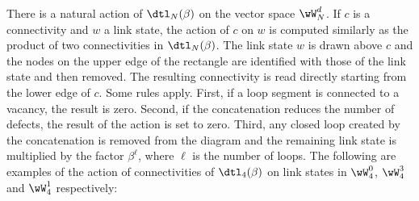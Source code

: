 \documentclass[11pt]{article}
\numberwithin{equation}{section}
\theoremstyle{alexi}
\begin{document}
There is a natural action of $\dtl_N(\beta)$ on the vector space $\wW_{N}^d$. If $c$ is a connectivity and $w$ a link state, the action of $c$ on $w$ is computed similarly as the product of two connectivities in $\dtl_N(\beta)$. The link state $w$ is drawn above $c$ and the nodes on the upper edge of the rectangle are identified with those of the link state and then removed. The resulting connectivity is read directly starting from the lower edge of $c$. Some rules apply. First, if a loop segment is connected to a vacancy, the result is zero. Second, if the concatenation reduces the number of defects, the result of the action is set to zero. Third, any closed loop created by the concatenation is removed from the diagram and the remaining link state is multiplied by the factor $\beta^\ell$, where $\ell$ is the number of loops. The following are examples of the action of connectivities of $\dtl_4(\beta)$ on link states in $\wW_4^0$, $\wW_4^3$ and $\wW_4^1$ respectively: 
\end{document}
